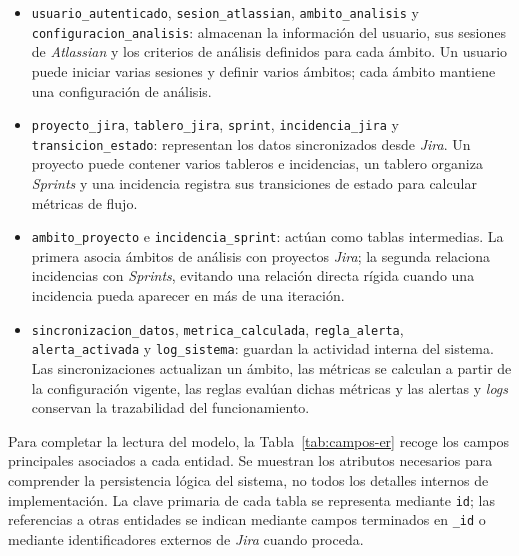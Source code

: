 \begin{itemize}
    \item \texttt{usuario\_autenticado}, \texttt{sesion\_atlassian}, \texttt{ambito\_analisis} y \texttt{configuracion\_analisis}: almacenan la información del usuario, sus sesiones de \textit{Atlassian} y los criterios de análisis definidos para cada ámbito. Un usuario puede iniciar varias sesiones y definir varios ámbitos; cada ámbito mantiene una configuración de análisis.
    \item \texttt{proyecto\_jira}, \texttt{tablero\_jira}, \texttt{sprint}, \texttt{incidencia\_jira} y \texttt{transicion\_estado}: representan los datos sincronizados desde \textit{Jira}. Un proyecto puede contener varios tableros e incidencias, un tablero organiza \textit{Sprints} y una incidencia registra sus transiciones de estado para calcular métricas de flujo.
    \item \texttt{ambito\_proyecto} e \texttt{incidencia\_sprint}: actúan como tablas intermedias. La primera asocia ámbitos de análisis con proyectos \textit{Jira}; la segunda relaciona incidencias con \textit{Sprints}, evitando una relación directa rígida cuando una incidencia pueda aparecer en más de una iteración.
    \item \texttt{sincronizacion\_datos}, \texttt{metrica\_calculada}, \texttt{regla\_alerta}, \texttt{alerta\_activada} y \texttt{log\_sistema}: guardan la actividad interna del sistema. Las sincronizaciones actualizan un ámbito, las métricas se calculan a partir de la configuración vigente, las reglas evalúan dichas métricas y las alertas y \textit{logs} conservan la trazabilidad del funcionamiento.
\end{itemize}

Para completar la lectura del modelo, la Tabla~\ref{tab:campos-er} recoge los campos principales asociados a cada entidad. Se muestran los atributos necesarios para comprender la persistencia lógica del sistema, no todos los detalles internos de implementación. La clave primaria de cada tabla se representa mediante \texttt{id}; las referencias a otras entidades se indican mediante campos terminados en \texttt{\_id} o mediante identificadores externos de \textit{Jira} cuando proceda.

